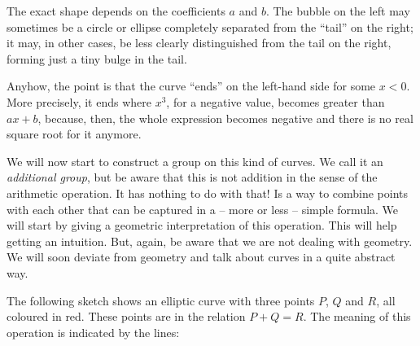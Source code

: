 \documentclass[tikz]{scrreprt}
\begin{document}
The exact shape depends on the coefficients $a$ and $b$.
The bubble on the left may sometimes be a circle or ellipse
completely separated from the ``tail'' on the right;
it may, in other cases, be less clearly distinguished
from the tail on the right, forming just a tiny bulge in the tail.

Anyhow, the point is that the curve ``ends'' on the left-hand side
for some $x < 0$. More precisely, it ends where $x^3$, for a negative
value, becomes greater than $ax + b$, because, then, the whole 
expression becomes negative and there is no real square root for it
anymore.

We will now start to construct a group on this kind of curves.
We call it an \emph{additional group}, but be aware that this
is not addition in the sense of the arithmetic operation.
It has nothing to do with that! Is a way to combine points
with each other that can be captured in a  -- more or less -- 
simple formula. We will start by giving a geometric interpretation
of this operation. This will help getting an intuition.
But, again, be aware that we are not dealing with geometry.
We will soon deviate from geometry and talk about curves
in a quite abstract way.

The following sketch shows an elliptic curve
with three points $P$, $Q$ and $R$,
all coloured in red.
These points are in the relation
$P + Q = R$.
The meaning of this operation is indicated by
the lines:

\begin{center}
\end{center}
\end{document}
